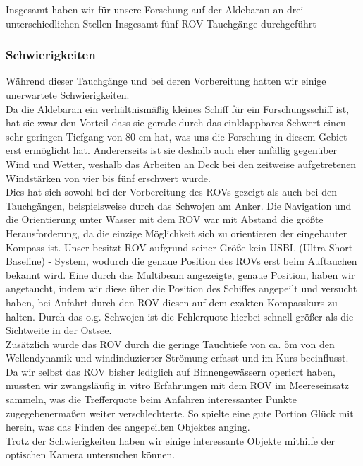 Insgesamt haben wir für unsere Forschung auf der Aldebaran an drei unterschiedlichen Stellen Insgesamt fünf ROV Tauchgänge durchgeführt 
\subsubsection{Schwierigkeiten}
Während dieser Tauchgänge und bei deren Vorbereitung hatten wir einige unerwartete Schwierigkeiten.\\
Da die Aldebaran ein verhältnismäßig kleines Schiff für ein Forschungsschiff ist, hat sie zwar den Vorteil dass sie gerade durch das einklappbares Schwert einen sehr geringen Tiefgang von 80 cm hat, was uns die Forschung in diesem Gebiet erst ermöglicht hat.
Andererseits ist sie deshalb auch eher anfällig gegenüber Wind und Wetter, weshalb das Arbeiten an Deck bei den zeitweise aufgetretenen Windstärken von vier bis fünf erschwert wurde.\\
Dies hat sich sowohl bei der Vorbereitung des ROVs gezeigt als auch bei den Tauchgängen, beispielsweise durch das Schwojen am Anker.
Die Navigation und die Orientierung unter Wasser mit dem ROV war mit Abstand die größte Herausforderung, da die einzige Möglichkeit sich zu orientieren der eingebauter Kompass ist.
Unser besitzt ROV aufgrund seiner Größe kein USBL (Ultra Short Baseline) - System, wodurch die genaue Position des ROVs erst beim Auftauchen bekannt wird.
Eine durch das Multibeam angezeigte, genaue Position, haben wir angetaucht, indem wir diese über die Position des Schiffes angepeilt und versucht haben, bei Anfahrt durch den ROV diesen auf dem exakten Kompasskurs zu halten.
Durch das o.g. Schwojen ist die Fehlerquote hierbei schnell größer als die Sichtweite in der Ostsee. \\ Zusätzlich wurde das ROV 
durch die geringe Tauchtiefe von ca. 5m von den Wellendynamik und windinduzierter Strömung erfasst und im Kurs beeinflusst. 
Da wir selbst das ROV bisher lediglich auf Binnengewässern operiert haben, mussten wir zwangsläufig in vitro Erfahrungen mit dem ROV im Meereseinsatz sammeln, was die Trefferquote beim Anfahren interessanter Punkte zugegebenermaßen weiter verschlechterte. So spielte eine gute Portion Glück mit herein, was das Finden des angepeilten Objektes anging.\\
Trotz der Schwierigkeiten haben wir einige interessante Objekte mithilfe der optischen Kamera untersuchen können.\\

